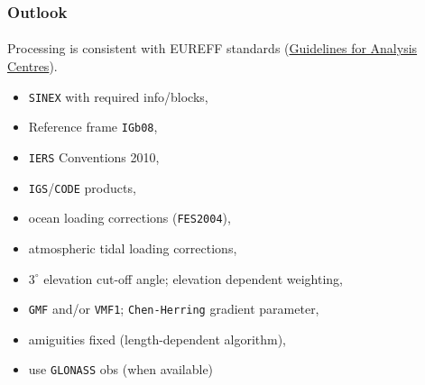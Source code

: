 \documentclass{beamer}
\begin{document}
\begin{frame}\frametitle{Outlook}\framesubtitle{}
  Processing is consistent with EUREFF standards (\href{http://www.epncb.oma.be/_documentation/guidelines/guidelines_analysis_centres.pdf}{Guidelines for Analysis Centres}).
  \begin{itemize}[label={\checkmark}]
    \item \texttt{SINEX} with required info/blocks,
    \item Reference frame \texttt{IGb08},
    \item \texttt{IERS} Conventions 2010,
    \item \texttt{IGS}/\texttt{CODE} products,
    \item ocean loading corrections (\texttt{FES2004}),
    \item atmospheric tidal loading corrections,
    \item $3^{\circ}$ elevation cut-off angle; elevation dependent weighting,
    \item \texttt{GMF} and/or \texttt{VMF1}; \texttt{Chen-Herring} gradient parameter,
    \item amiguities fixed (length-dependent algorithm),
    \item use \texttt{GLONASS} obs (when available)
  \end{itemize}

\end{frame}
\end{document}

